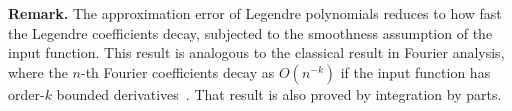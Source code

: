 \documentclass[../hippo.tex]{subfiles}
\begin{document}
\textbf{Remark.} The approximation error of Legendre polynomials
reduces to how fast the Legendre coefficients decay, subjected to the smoothness
assumption of the input function.
This result is analogous to the classical result in Fourier
analysis, where the $n$-th Fourier coefficients decay as $O(n^{-k})$ if the input
function has order-$k$ bounded derivatives~\citep{korner1989fourier}.
That result is also proved by integration by parts.
\end{document}
